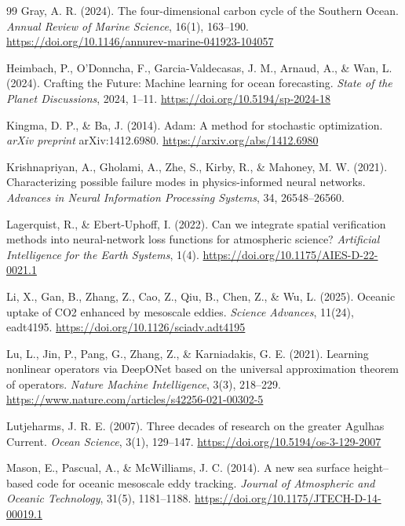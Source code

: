 \documentclass[11pt]{article}
\begin{document}
\begin{thebibliography}{99}
 Gray, A. R. (2024). The four-dimensional carbon cycle of the Southern Ocean. \textit{Annual Review of Marine Science}, 16(1), 163--190. \url{https://doi.org/10.1146/annurev-marine-041923-104057}

 Heimbach, P., O'Donncha, F., Garcia-Valdecasas, J. M., Arnaud, A., \& Wan, L. (2024). Crafting the Future: Machine learning for ocean forecasting. \textit{State of the Planet Discussions}, 2024, 1--11. \url{https://doi.org/10.5194/sp-2024-18}

 Kingma, D. P., \& Ba, J. (2014). Adam: A method for stochastic optimization. \textit{arXiv preprint} arXiv:1412.6980. \url{https://arxiv.org/abs/1412.6980}

 Krishnapriyan, A., Gholami, A., Zhe, S., Kirby, R., \& Mahoney, M. W. (2021). Characterizing possible failure modes in physics-informed neural networks. \textit{Advances in Neural Information Processing Systems}, 34, 26548--26560.

 Lagerquist, R., \& Ebert-Uphoff, I. (2022). Can we integrate spatial verification methods into neural-network loss functions for atmospheric science? \textit{Artificial Intelligence for the Earth Systems}, 1(4). \url{https://doi.org/10.1175/AIES-D-22-0021.1}

 Li, X., Gan, B., Zhang, Z., Cao, Z., Qiu, B., Chen, Z., \& Wu, L. (2025). Oceanic uptake of CO2 enhanced by mesoscale eddies. \textit{Science Advances}, 11(24), eadt4195. \url{https://doi.org/10.1126/sciadv.adt4195}

 Lu, L., Jin, P., Pang, G., Zhang, Z., \& Karniadakis, G. E. (2021). Learning nonlinear operators via DeepONet based on the universal approximation theorem of operators. \textit{Nature Machine Intelligence}, 3(3), 218--229. \url{https://www.nature.com/articles/s42256-021-00302-5}

 Lutjeharms, J. R. E. (2007). Three decades of research on the greater Agulhas Current. \textit{Ocean Science}, 3(1), 129--147. \url{https://doi.org/10.5194/os-3-129-2007}

 Mason, E., Pascual, A., \& McWilliams, J. C. (2014). A new sea surface height--based code for oceanic mesoscale eddy tracking. \textit{Journal of Atmospheric and Oceanic Technology}, 31(5), 1181--1188. \url{https://doi.org/10.1175/JTECH-D-14-00019.1}


\end{thebibliography}
\end{document}
